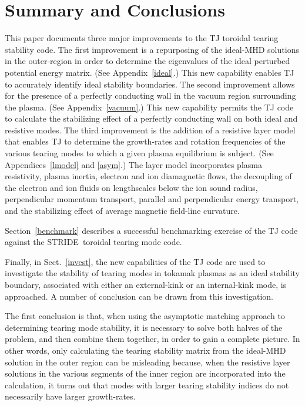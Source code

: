 \documentclass[12pt,prb,aps]{revtex4-1}
\begin{document}
\section{Summary and Conclusions}\label{conc}
This paper documents three major improvements to the TJ toroidal tearing stability code.\cite{tj} The first improvement is a repurposing of the
ideal-MHD solutions in the outer-region in order to determine the eigenvalues of the ideal perturbed potential energy matrix. (See Appendix~\ref{ideal}.)
This new capability enables TJ to accurately identify ideal stability boundaries. The second improvement allows for the presence of
a perfectly conducting wall in the vacuum region surrounding the plasma. (See Appendix~\ref{vacuum}.) This new capability permits the TJ code 
to calculate the stabilizing effect of a perfectly conducting wall on both ideal and resistive modes. The third improvement is the addition of
a resistive layer model that enables TJ to determine the  growth-rates and rotation frequencies of the various tearing modes to which a
given plasma equilibrium is subject. (See Appendices~\ref{lmodel} and \ref{asym}.) The layer model incorporates 
plasma resistivity, plasma inertia, electron and ion diamagnetic flows, the decoupling of the electron and ion fluids on lengthscales below the ion sound radius, perpendicular
momentum transport, parallel and perpendicular energy transport, and the stabilizing effect of average magnetic field-line curvature.

Section~\ref{benchmark} describes a successful benchmarking exercise of the TJ code against the STRIDE\,\cite{aglas1} toroidal tearing mode code.

Finally, in Sect.~\ref{invest}, the new capabilities of the TJ code are used to investigate the stability of tearing modes in tokamak plasmas as
an ideal stability boundary, associated with either an external-kink or an internal-kink mode, is  approached. A number of conclusion can be drawn
from this investigation. 

The first conclusion is that, when using the asymptotic matching approach to determining tearing mode stability, it is necessary to
solve both halves of the problem, and then combine them together, in order to gain a complete picture. In other words, only calculating the tearing
stability matrix from the ideal-MHD solution in the outer region can be misleading because, when the resistive layer solutions in the
various segments of the inner region are incorporated into the calculation, it turns out that modes with larger tearing stability indices do not
necessarily have  larger growth-rates. 
\end{document}
